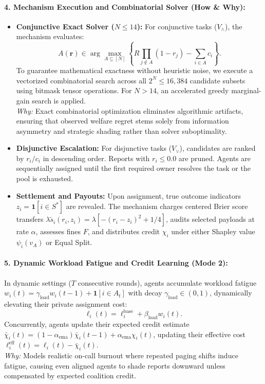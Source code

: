 \documentclass{article}
\theoremstyle{definition}
\begin{document}
\paragraph{4. Mechanism Execution and Combinatorial Solver (How \& Why):}
\begin{itemize}
    \item \textbf{Conjunctive Exact Solver ($N \le 14$):} For conjunctive tasks ($V_\wedge$), the mechanism evaluates:
    \begin{equation}
        A(\mathbf{r}) \in \arg\max_{A \subseteq [N]} \left\{ R \prod_{j \notin A} (1 - r_j) - \sum_{i \in A} c_i \right\}.
    \end{equation}
    To guarantee mathematical exactness without heuristic noise, we execute a vectorized combinatorial search across all $2^N \le 16,384$ candidate subsets using bitmask tensor operations. For $N > 14$, an accelerated greedy marginal-gain search is applied. \\
    \emph{Why:} Exact combinatorial optimization eliminates algorithmic artifacts, ensuring that observed welfare regret stems solely from information asymmetry and strategic shading rather than solver suboptimality.
    \item \textbf{Disjunctive Escalation:} For disjunctive tasks ($V_\vee$), candidates are ranked by $r_i / c_i$ in descending order. Reports with $r_i \le 0.0$ are pruned. Agents are sequentially assigned until the first required owner resolves the task or the pool is exhausted.
    \item \textbf{Settlement and Payouts:} Upon assignment, true outcome indicators $z_i = \mathbf{1}[i \in S^*]$ are revealed. The mechanism charges centered Brier score transfers $\lambda \tilde{s}_i(r_i, z_i) = \lambda [-(r_i - z_i)^2 + 1/4]$, audits selected payloads at rate $\alpha$, assesses fines $F$, and distributes credit $\chi_i$ under either Shapley value $\psi_i(v_A)$ or Equal Split.
\end{itemize}

\paragraph{5. Dynamic Workload Fatigue and Credit Learning (Mode 2):}
In dynamic settings ($T$ consecutive rounds), agents accumulate workload fatigue $w_i(t) = \gamma_{\mathrm{load}} w_i(t-1) + \mathbf{1}[i \in A_t]$ with decay $\gamma_{\mathrm{load}} \in (0, 1)$, dynamically elevating their private assignment cost:
\begin{equation}
    \ell_i(t) = \ell_i^{\mathrm{base}} + \beta_{\mathrm{load}} w_i(t).
\end{equation}
Concurrently, agents update their expected credit estimate $\bar{\chi}_i(t) = (1 - \alpha_{\mathrm{ema}}) \bar{\chi}_i(t-1) + \alpha_{\mathrm{ema}} \chi_i(t)$, updating their effective cost $\ell_i^{\mathrm{eff}}(t) = \ell_i(t) - \bar{\chi}_i(t)$. \\
\emph{Why:} Models realistic on-call burnout where repeated paging shifts induce fatigue, causing even aligned agents to shade reports downward unless compensated by expected coalition credit.
\end{document}
